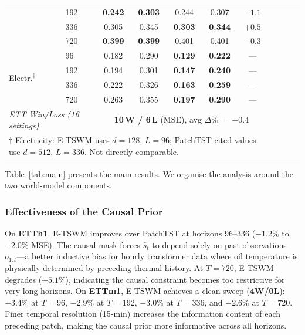 \documentclass[conference]{IEEEtran}
\begin{document}
\begin{table}[t]
{\begin{tabular}{ll cccc cccc c}
        & 192 & \textbf{0.242} & \textbf{0.303} & 0.244 & 0.307 & $-1.1$ \\
        & 336 & 0.305 & 0.345 & \textbf{0.303} & \textbf{0.344} & $+0.5$ \\
        & 720 & \textbf{0.399} & \textbf{0.399} & 0.401 & 0.401 & $-0.3$ \\
        \midrule
        \multirow{4}{*}{Electr.$^\dagger$}
        & 96  & 0.182 & 0.290 & \textbf{0.129} & \textbf{0.222} & --- \\
        & 192 & 0.194 & 0.301 & \textbf{0.147} & \textbf{0.240} & --- \\
        & 336 & 0.222 & 0.326 & \textbf{0.163} & \textbf{0.259} & --- \\
        & 720 & 0.263 & 0.355 & \textbf{0.197} & \textbf{0.290} & --- \\
        \midrule
        \multicolumn{2}{l}{\textit{ETT Win/Loss (16 settings)}} & \multicolumn{5}{c}{\textbf{10\,W / 6\,L} (MSE), avg $\Delta$\% $= -0.4$} \\
        \bottomrule
        \multicolumn{7}{l}{\footnotesize $\dagger$ Electricity: E-TSWM uses $d{=}128$, $L{=}96$; PatchTST cited values use $d{=}512$, $L{=}336$. Not directly comparable.}
    \end{tabular}
    }
\end{table}

Table~\ref{tab:main} presents the main results. We organise the analysis around the two world-model components.

\subsubsection{Effectiveness of the Causal Prior}

On \textbf{ETTh1}, E-TSWM improves over PatchTST at horizons 96--336 ($-1.2\%$ to $-2.0\%$ MSE). The causal mask forces $\hat{s}_t$ to depend solely on past observations $o_{1:t}$---a better inductive bias for hourly transformer data where oil temperature is physically determined by preceding thermal history. At $T{=}720$, E-TSWM degrades ($+5.1\%$), indicating the causal constraint becomes too restrictive for very long horizons.
On \textbf{ETTm1}, E-TSWM achieves a clean sweep (\textbf{4W/0L}): $-3.4\%$ at $T{=}96$, $-2.9\%$ at $T{=}192$, $-3.0\%$ at $T{=}336$, and $-2.6\%$ at $T{=}720$. Finer temporal resolution (15-min) increases the information content of each preceding patch, making the causal prior more informative across all horizons.
\end{document}

